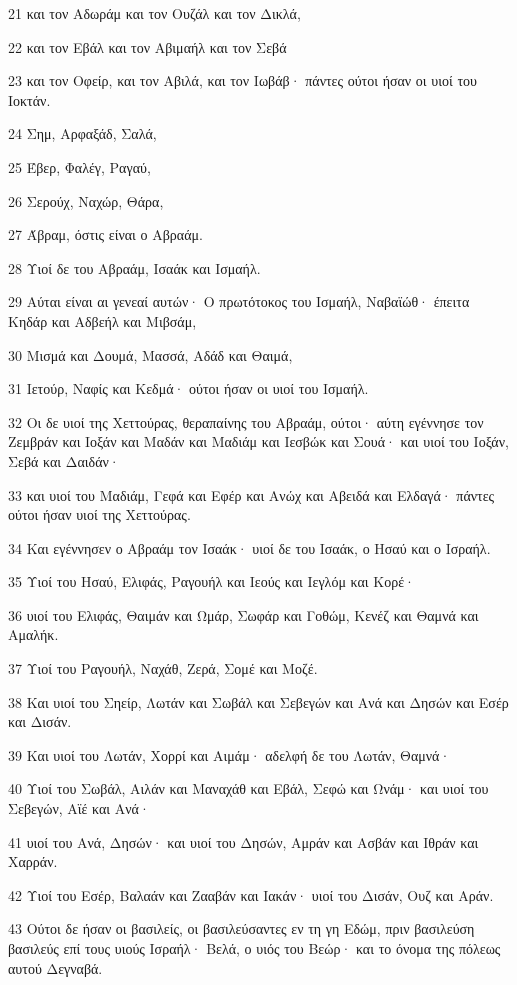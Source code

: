 \par 21 και τον Αδωράμ και τον Ουζάλ και τον Δικλά,
\par 22 και τον Εβάλ και τον Αβιμαήλ και τον Σεβά
\par 23 και τον Οφείρ, και τον Αβιλά, και τον Ιωβάβ· πάντες ούτοι ήσαν οι υιοί του Ιοκτάν.
\par 24 Σημ, Αρφαξάδ, Σαλά,
\par 25 Έβερ, Φαλέγ, Ραγαύ,
\par 26 Σερούχ, Ναχώρ, Θάρα,
\par 27 Άβραμ, όστις είναι ο Αβραάμ.
\par 28 Υιοί δε του Αβραάμ, Ισαάκ και Ισμαήλ.
\par 29 Αύται είναι αι γενεαί αυτών· Ο πρωτότοκος του Ισμαήλ, Ναβαϊώθ· έπειτα Κηδάρ και Αδβεήλ και Μιβσάμ,
\par 30 Μισμά και Δουμά, Μασσά, Αδάδ και Θαιμά,
\par 31 Ιετούρ, Ναφίς και Κεδμά· ούτοι ήσαν οι υιοί του Ισμαήλ.
\par 32 Οι δε υιοί της Χεττούρας, θεραπαίνης του Αβραάμ, ούτοι· αύτη εγέννησε τον Ζεμβράν και Ιοξάν και Μαδάν και Μαδιάμ και Ιεσβώκ και Σουά· και υιοί του Ιοξάν, Σεβά και Δαιδάν·
\par 33 και υιοί του Μαδιάμ, Γεφά και Εφέρ και Ανώχ και Αβειδά και Ελδαγά· πάντες ούτοι ήσαν υιοί της Χεττούρας.
\par 34 Και εγέννησεν ο Αβραάμ τον Ισαάκ· υιοί δε του Ισαάκ, ο Ησαύ και ο Ισραήλ.
\par 35 Υιοί του Ησαύ, Ελιφάς, Ραγουήλ και Ιεούς και Ιεγλόμ και Κορέ·
\par 36 υιοί του Ελιφάς, Θαιμάν και Ωμάρ, Σωφάρ και Γοθώμ, Κενέζ και Θαμνά και Αμαλήκ.
\par 37 Υιοί του Ραγουήλ, Ναχάθ, Ζερά, Σομέ και Μοζέ.
\par 38 Και υιοί του Σηείρ, Λωτάν και Σωβάλ και Σεβεγών και Ανά και Δησών και Εσέρ και Δισάν.
\par 39 Και υιοί του Λωτάν, Χορρί και Αιμάμ· αδελφή δε του Λωτάν, Θαμνά·
\par 40 Υιοί του Σωβάλ, Αιλάν και Μαναχάθ και Εβάλ, Σεφώ και Ωνάμ· και υιοί του Σεβεγών, Αϊέ και Ανά·
\par 41 υιοί του Ανά, Δησών· και υιοί του Δησών, Αμράν και Ασβάν και Ιθράν και Χαρράν.
\par 42 Υιοί του Εσέρ, Βαλαάν και Ζααβάν και Ιακάν· υιοί του Δισάν, Ουζ και Αράν.
\par 43 Ούτοι δε ήσαν οι βασιλείς, οι βασιλεύσαντες εν τη γη Εδώμ, πριν βασιλεύση βασιλεύς επί τους υιούς Ισραήλ· Βελά, ο υιός του Βεώρ· και το όνομα της πόλεως αυτού Δεγναβά.
